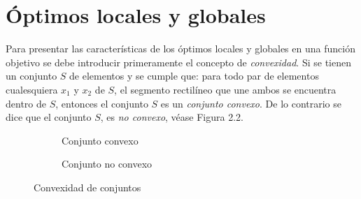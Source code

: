 \section{Óptimos locales y globales}
Para presentar las características de los óptimos locales y globales en una función objetivo se debe introducir primeramente el concepto de \textit{convexidad}. Si se tienen un conjunto $S$ de elementos y se cumple que: para todo par de elementos cualesquiera $x_1$ y $x_2$ de $S$, el segmento rectilíneo que une ambos se encuentra dentro de $S$, entonces el conjunto $S$ es un \textit{conjunto convexo}. De lo contrario se dice que el  conjunto $S$, es \textit{no convexo}, véase Figura 2.2. 

\begin{figure}[h]  
\centering 
  \begin{subfigure}[b]{0.45\linewidth}
    \caption{Conjunto convexo} \label{fig:M1}  
  \end{subfigure}
\begin{subfigure}[b]{0.45\linewidth}
\caption{Conjunto no convexo} \label{fig:M2}  
\end{subfigure}
\caption{Convexidad de conjuntos}
\end{figure}
	 
